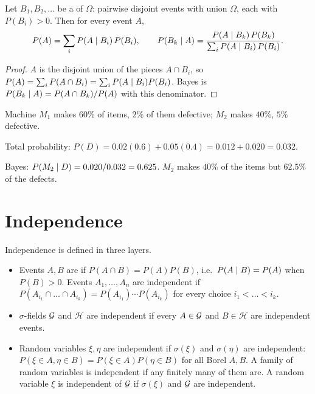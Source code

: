 \begin{result}
\label{res:total}
Let $B_1,B_2,\ldots$ be a  of $\Omega$: pairwise disjoint events with union $\Omega$, each with $P(B_i)>0$. Then for every event $A$,
\[
  P(A)=\sum_i P(A\mid B_i)\,P(B_i),\qquad
  P(B_k\mid A)=\frac{P(A\mid B_k)\,P(B_k)}{\sum_iP(A\mid B_i)\,P(B_i)} .
\]
\end{result}
\begin{proof}
$A$ is the disjoint union of the pieces $A\cap B_i$, so $P(A)=\sum_iP(A\cap B_i)=\sum_iP(A\mid B_i)P(B_i)$. Bayes is $P(B_k\mid A)=P(A\cap B_k)/P(A)$ with this denominator.
\end{proof}

\begin{example}
Machine $M_1$ makes $60\%$ of items, $2\%$ of them defective; $M_2$ makes $40\%$, $5\%$ defective.
\begin{steps}
  \item Total probability: $P(D)=0.02(0.6)+0.05(0.4)=0.012+0.020=0.032$.
  \item Bayes: $P(M_2\mid D)=0.020/0.032=0.625$. $M_2$ makes $40\%$ of the items but $62.5\%$ of the defects.
\end{steps}
\end{example}

\section{Independence}

\begin{definition}[Independence]
\label{def:indep}
Independence is defined in three layers.
\begin{itemize}
  \item Events $A,B$ are  if $P(A\cap B)=P(A)P(B)$, i.e.\ $P(A\mid B)=P(A)$ when $P(B)>0$. Events $A_1,\dots,A_n$ are independent if $P(A_{i_1}\cap\dots\cap A_{i_k})=P(A_{i_1})\cdots P(A_{i_k})$ for every choice $i_1<\dots<i_k$.
  \item $\sigma$-fields $\mathcal G$ and $\mathcal H$ are independent if every $A\in\mathcal G$ and $B\in\mathcal H$ are independent events.
  \item Random variables $\xi,\eta$ are independent if $\sigma(\xi)$ and $\sigma(\eta)$ are independent: $P(\xi\in A,\eta\in B)=P(\xi\in A)P(\eta\in B)$ for all Borel $A,B$. A family of random variables is independent if any finitely many of them are. A random variable $\xi$ is independent of $\mathcal G$ if $\sigma(\xi)$ and $\mathcal G$ are independent.
\end{itemize}
\end{definition}

